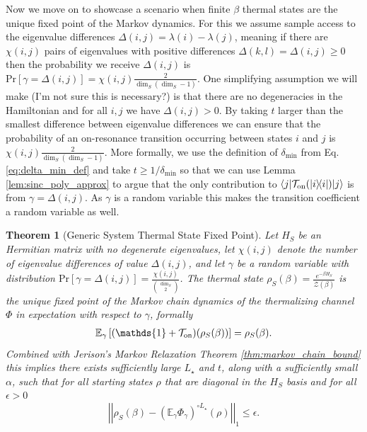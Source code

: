 \documentclass{article}
\newtheorem{theorem}{Theorem}
\newcommand{\on}{\rm on}
\newcommand{\ket}[1]{|#1\rangle}
\newcommand{\bra}[1]{\langle #1|}
\newcommand{\ketbra}[2]{| #1\rangle\! \langle #2|}
\newcommand{\norm}[1]{\left| \left| #1 \right| \right|}
\newcommand{\prob}[1]{\text{Pr}\left[ #1 \right]}
\newcommand{\partfun}{\mathcal{Z}}
\newcommand{\identity}{\mathds{1}}
\begin{document}
Now we move on to showcase a scenario when finite $\beta$ thermal states are the unique fixed point of the Markov dynamics. For this we assume sample access to the eigenvalue differences $\Delta(i,j) = \lambda(i) - \lambda(j)$, meaning if there are $\chi(i,j)$ pairs of eigenvalues with positive differences $\Delta(k,l) = \Delta(i,j) \ge 0$ then the probability we receive $\Delta(i,j)$ is $\prob{\gamma = \Delta(i,j)} = \chi(i,j) \frac{2}{\dim_S(\dim_S - 1)}$. One simplifying assumption we will make (I'm not sure this is necessary?) is that there are no degeneracies in the Hamiltonian and for all $i,j$ we have $\Delta(i,j) > 0$. By taking $t$ larger than the smallest difference between eigenvalue differences we can ensure that the probability of an on-resonance transition occurring between states $i$ and $j$ is $\chi(i,j) \frac{2}{\dim_S(\dim_S - 1)}$. More formally, we use the definition of $\delta_{\min}$ from Eq. \eqref{eq:delta_min_def} and take $t \ge 1/ \delta_{\min}$ so that we can use Lemma \ref{lem:sinc_poly_approx} to argue that the only contribution to $\bra{j} \mathcal{T}_{\on}(\ketbra{i}{i}) \ket{j}$ is from $\gamma = \Delta(i,j)$. As $\gamma$ is a random variable this makes the transition coefficient a random variable as well. 

\begin{theorem}[Generic System Thermal State Fixed Point]
    Let $H_S$ be an Hermitian matrix with no degenerate eigenvalues, let $\chi(i,j)$ denote the number of eigenvalue differences of value $\Delta(i,j)$, and let $\gamma$ be a random variable with distribution $\prob{\gamma = \Delta(i,j)} = \frac{\chi(i,j)}{\binom{\dim_S}{2}}$. The thermal state $\rho_S(\beta) = \frac{e^{-\beta H_S}}{\partfun(\beta)}$ is the unique fixed point of the Markov chain dynamics of the thermalizing channel $\Phi$ in expectation with respect to $\gamma$, formally
    \begin{align}
        \mathbb{E}_{\gamma} \left[ (\identity + \mathcal{T}_{\on})(\rho_S(\beta)) \right] = \rho_S(\beta).
    \end{align}
    Combined with Jerison's Markov Relaxation Theorem \ref{thm:markov_chain_bound} this implies there exists sufficiently large $L_\star$ and $t$, along with a sufficiently small $\alpha$, such that for all starting states $\rho$ that are diagonal in the $H_S$ basis and for all $\epsilon > 0$
    \begin{equation}
    \norm{\rho_S(\beta) - (\mathbb{E}_\gamma \Phi_\gamma)^{\circ L_\star}(\rho)}_1 \le \epsilon.
    \end{equation}
\end{theorem}
\end{document}
